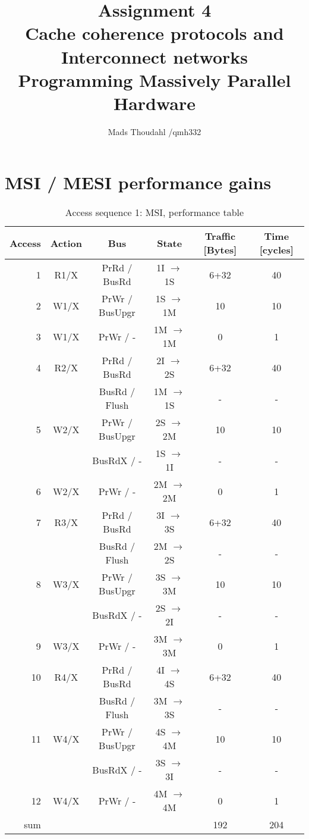 \documentclass[a4paper,10pt]{article}
\title{Assignment 4 \\ Cache coherence protocols and Interconnect networks \\ Programming Massively Parallel Hardware }
\author{Mads Thoudahl  /qmh332}
\begin{document}
\maketitle
\section{MSI / MESI performance gains}

\begin{table}[h]
  \centering
  \begin{tabular}{rccccc}
    Access & Action & Bus & State & Traffic [Bytes] & Time [cycles] \\ \hline
     1 & R1/X & PrRd / BusRd & 1I $\rightarrow$ 1S  & 6+32 & 40 \\
     2 & W1/X & PrWr / BusUpgr & 1S $\rightarrow$ 1M & 10 & 10 \\
     3 & W1/X & PrWr / - & 1M $\rightarrow$ 1M & 0 & 1 \\

     4 & R2/X & PrRd / BusRd & 2I $\rightarrow$ 2S  & 6+32 & 40 \\
       &      & BusRd / Flush & 1M $\rightarrow$ 1S & - & - \\
     5 & W2/X & PrWr / BusUpgr & 2S $\rightarrow$ 2M & 10 & 10 \\
       &      & BusRdX / - & 1S $\rightarrow$ 1I & - & - \\
     6 & W2/X & PrWr / - & 2M $\rightarrow$ 2M & 0 & 1 \\

     7 & R3/X & PrRd / BusRd & 3I $\rightarrow$ 3S  & 6+32 & 40 \\
       &      & BusRd / Flush & 2M $\rightarrow$ 2S & - & - \\
     8 & W3/X & PrWr / BusUpgr & 3S $\rightarrow$ 3M & 10 & 10 \\
       &      & BusRdX / - & 2S $\rightarrow$ 2I & - & - \\
     9 & W3/X & PrWr / - & 3M $\rightarrow$ 3M & 0 & 1 \\

    10 & R4/X & PrRd / BusRd & 4I $\rightarrow$ 4S  & 6+32 & 40 \\
       &      & BusRd / Flush & 3M $\rightarrow$ 3S & - & - \\
    11 & W4/X & PrWr / BusUpgr & 4S $\rightarrow$ 4M & 10 & 10 \\
       &      & BusRdX / - & 3S $\rightarrow$ 3I & - & - \\
    12 & W4/X & PrWr / - & 4M $\rightarrow$ 4M & 0 & 1 \\ \hline

    sum & & & & 192 & 204 \\ \hline \hline
  \end{tabular}
  \caption{Access sequence 1: MSI, performance table}
  \label{tab:msi_1}
\end{table}
\end{document}
